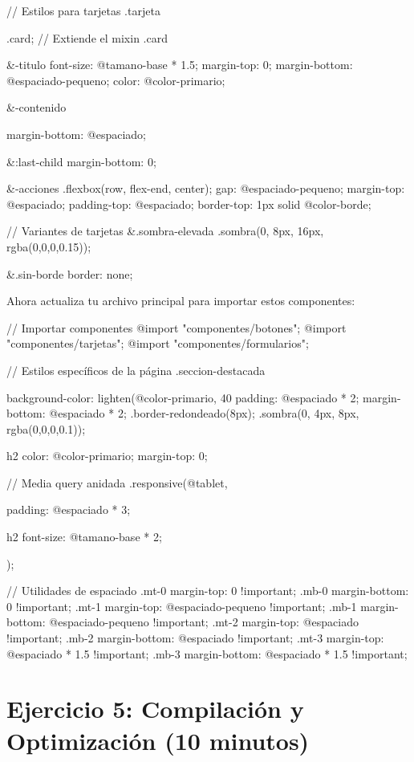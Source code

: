 \documentclass[12pt, a4paper]{article}
\newcommand{\ejercicio}[2]{
    \section*{Ejercicio #1: #2}
    \vspace{0.3em}
}
\begin{document}
\begin{codebox}[title=styles/componentes/tarjetas.less]
// Estilos para tarjetas
.tarjeta {
  .card; // Extiende el mixin .card
  
  &-titulo {
    font-size: @tamano-base * 1.5;
    margin-top: 0;
    margin-bottom: @espaciado-pequeno;
    color: @color-primario;
  }
  
  &-contenido {
    margin-bottom: @espaciado;
    
    &:last-child {
      margin-bottom: 0;
    }
  }
  
  &-acciones {
    .flexbox(row, flex-end, center);
    gap: @espaciado-pequeno;
    margin-top: @espaciado;
    padding-top: @espaciado;
    border-top: 1px solid @color-borde;
  }
  
  // Variantes de tarjetas
  &.sombra-elevada {
    .sombra(0, 8px, 16px, rgba(0,0,0,0.15));
  }
  
  &.sin-borde {
    border: none;
  }
}
\end{codebox}

Ahora actualiza tu archivo principal para importar estos componentes:

\begin{codebox}[title=styles/main.less (continuación)]
// Importar componentes
@import "componentes/botones";
@import "componentes/tarjetas";
@import "componentes/formularios";

// Estilos específicos de la página
.seccion-destacada {
  background-color: lighten(@color-primario, 40%
  padding: @espaciado * 2;
  margin-bottom: @espaciado * 2;
  .border-redondeado(8px);
  .sombra(0, 4px, 8px, rgba(0,0,0,0.1));
  
  h2 {
    color: @color-primario;
    margin-top: 0;
  }
  
  // Media query anidada
  .responsive(@tablet, {
    padding: @espaciado * 3;
    
    h2 {
      font-size: @tamano-base * 2;
    }
  });
}

// Utilidades de espaciado
.mt-0 { margin-top: 0 !important; }
.mb-0 { margin-bottom: 0 !important; }
.mt-1 { margin-top: @espaciado-pequeno !important; }
.mb-1 { margin-bottom: @espaciado-pequeno !important; }
.mt-2 { margin-top: @espaciado !important; }
.mb-2 { margin-bottom: @espaciado !important; }
.mt-3 { margin-top: @espaciado * 1.5 !important; }
.mb-3 { margin-bottom: @espaciado * 1.5 !important; }
\end{codebox}

\ejercicio{5}{Compilación y Optimización (10 minutos)}
\end{document}
